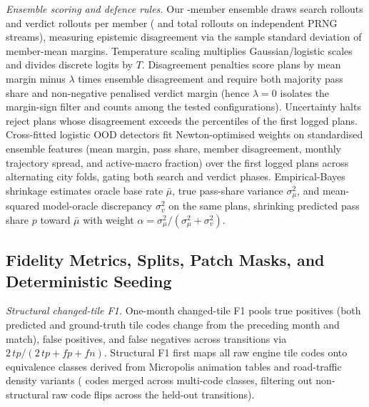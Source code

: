 \emph{Ensemble scoring and defence rules.} Our \DefMembers-member ensemble draws \KSearch{} search rollouts and \KVerdict{} verdict rollouts per member (\PrEnsSearchK{} and \PrEnsVerdictK{} total rollouts on independent PRNG streams), measuring epistemic disagreement via the sample standard deviation of member-mean margins. Temperature scaling multiplies Gaussian/logistic scales and divides discrete logits by $T$. Disagreement penalties score plans by mean margin minus $\lambda$ times ensemble disagreement and require both majority pass share and non-negative penalised verdict margin (hence $\lambda=0$ isolates the margin-sign filter and counts among the \DefTestedN{} tested configurations). Uncertainty halts reject plans whose disagreement exceeds the \DefHalts{} percentiles of the first \DefBudget{} logged plans. Cross-fitted logistic OOD detectors fit Newton-optimised weights on \PrDetFeatures{} standardised ensemble features (mean margin, pass share, member disagreement, monthly trajectory spread, and active-macro fraction) over the first \PrDetPlans{} logged plans across \DefDetFolds{} alternating city folds, gating both search and verdict phases. Empirical-Bayes shrinkage \citep{smith2006optimizer} estimates oracle base rate $\bar\mu$, true pass-share variance $\sigma_\mu^2$, and mean-squared model-oracle discrepancy $\sigma_v^2$ on the same \PrDetPlans{} plans, shrinking predicted pass share $p$ toward $\bar\mu$ with weight $\alpha = \sigma_\mu^2 / (\sigma_\mu^2 + \sigma_v^2)$.

\subsection{Fidelity Metrics, Splits, Patch Masks, and Deterministic Seeding}\label{app:other}

\emph{Structural changed-tile F1.} One-month changed-tile F1 pools true positives (both predicted and ground-truth tile codes change from the preceding month and match), false positives, and false negatives across transitions via $2\,tp/(2\,tp+fp+fn)$. Structural F1 first maps all \NCodes{} raw engine tile codes onto \PrTileClasses{} equivalence classes derived from Micropolis animation tables and road-traffic density variants (\PrTilesMerged{} codes merged across \PrMultiClasses{} multi-code classes, filtering out \PrNonStructShare{} non-structural raw code flips across the \PrHeldTransitions{} held-out transitions).

